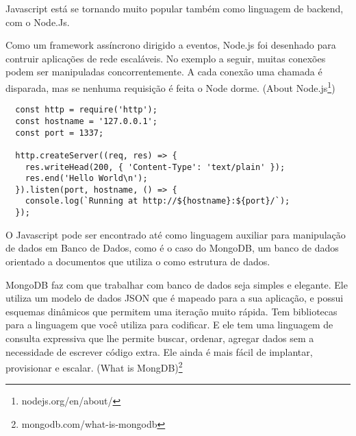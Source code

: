 Javascript está se tornando muito popular também como linguagem de backend, com o Node.Js.
\begin{citacao}
Como um framework assíncrono dirigido a eventos, Node.js foi desenhado para contruir aplicações de rede escaláveis. No exemplo a seguir, muitas conexões podem ser manipuladas concorrentemente. A cada conexão uma chamada é disparada, mas se nenhuma requisição é feita o Node dorme. (About Node.js\footnote{nodejs.org/en/about/})

\begin{verbatim}
  const http = require('http');
  const hostname = '127.0.0.1';
  const port = 1337;

  http.createServer((req, res) => {
    res.writeHead(200, { 'Content-Type': 'text/plain' });
    res.end('Hello World\n');
  }).listen(port, hostname, () => {
    console.log(`Running at http://${hostname}:${port}/`);
  });
\end{verbatim}
\end{citacao}

O Javascript pode ser encontrado até como linguagem auxiliar para manipulação de dados em Banco de Dados, como é o caso do MongoDB, um banco de dados orientado a documentos que utiliza o  como estrutura de dados.
\begin{citacao}
MongoDB faz com que trabalhar com banco de dados seja simples e elegante. Ele utiliza um modelo de dados JSON que é mapeado para a sua aplicação, e possui esquemas dinâmicos que permitem uma iteração muito rápida. Tem bibliotecas para a linguagem que você utiliza para codificar. E ele tem uma linguagem de consulta expressiva que lhe permite buscar, ordenar, agregar dados sem a necessidade de escrever código extra. Ele ainda é mais fácil de implantar, provisionar e escalar. (What is MongDB)\footnote{mongodb.com/what-is-mongodb}
\end{citacao}
